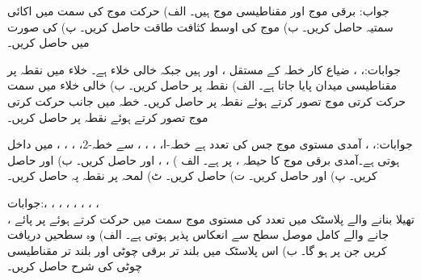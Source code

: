 جواب:
برقی موج  اور مقناطیسی موج
  ہیں۔ الف) حرکت موج کی سمت میں اکائی سمتیہ حاصل کریں۔ ب) موج کی اوسط کثافت طاقت حاصل کریں۔ پ)  کی صورت میں  حاصل کریں۔

جوابات:، ، 
ضیاع کار خطہ  کے مستقل ،  اور  ہیں  جبکہ  خالی خلاء ہے۔ خلاء میں نقطہ  پر مقناطیسی میدان  پایا جاتا ہے۔ الف) نقطہ  پر  حاصل کریں۔ ب) خالی خلاء میں  سمت حرکت کرتی موج تصور کرتے ہوئے  نقطہ  پر
  حاصل کریں۔ خطہ  میں  جانب حرکت کرتی موج تصور کرتے ہوئے  نقطہ  پر  حاصل کریں۔

جوابات:، 
،
آمدی مستوی موج جس کی تعدد  ہے خطہ-ا، ، ، ،  سے  خطہ-2، ، ، ،  میں داخل ہوتی ہے۔آمدی برقی موج کا حیطہ ،   پر  ہے۔ الف ) ، ،   اور  حاصل کریں۔ ب)  اور  حاصل کریں۔ پ)  اور  حاصل کریں۔ ت)  حاصل کریں۔ ٹ) لمحہ  پر نقطہ  پہ  حاصل کریں۔

جوابات:، ، ،
 ، ، ،
 ،
 ،\\
  ،
تھیلا بنانے والے پلاسٹک میں  تعدد کی مستوی موج  سمت میں حرکت کرتے ہوئے   پر پائے جانے والے کامل موصل سطح سے انعکاس پذیر ہوتی ہے۔ الف) وہ سطحیں دریافت کریں جن پر  ہو گا۔ ب) اس پلاسٹک  میں بلند تر برقی چوٹی اور بلند تر مقناطیسی چوٹی کی شرح حاصل کریں۔ 

